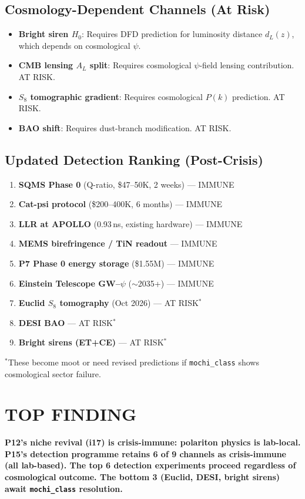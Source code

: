 \documentclass[11pt]{article}
\begin{document}
\subsection{Cosmology-Dependent Channels (At Risk)}
\begin{itemize}
\item \textbf{Bright siren $H_0$}: Requires DFD prediction for
  luminosity distance $d_L(z)$, which depends on cosmological $\psi$.
\item \textbf{CMB lensing $A_L$ split}: Requires cosmological
  $\psi$-field lensing contribution. AT RISK.
\item \textbf{$S_8$ tomographic gradient}: Requires cosmological
  $P(k)$ prediction. AT RISK.
\item \textbf{BAO shift}: Requires dust-branch modification. AT RISK.
\end{itemize}

\subsection{Updated Detection Ranking (Post-Crisis)}

\begin{enumerate}
\item \textbf{SQMS Phase 0} (Q-ratio, \$47--50K, 2 weeks) --- IMMUNE
\item \textbf{Cat-psi protocol} (\$200--400K, 6 months) --- IMMUNE
\item \textbf{LLR at APOLLO} (0.93\,ns, existing hardware) --- IMMUNE
\item \textbf{MEMS birefringence / TiN readout} --- IMMUNE
\item \textbf{P7 Phase 0 energy storage} (\$1.55M) --- IMMUNE
\item \textbf{Einstein Telescope GW--$\psi$} ($\sim$2035+) --- IMMUNE
\item \textbf{Euclid $S_8$ tomography} (Oct 2026) --- AT RISK$^*$
\item \textbf{DESI BAO} --- AT RISK$^*$
\item \textbf{Bright sirens (ET+CE)} --- AT RISK$^*$
\end{enumerate}

$^*$These become moot or need revised predictions if \texttt{mochi\_class}
shows cosmological sector failure.

\section*{TOP FINDING}

\begin{tcolorbox}[colback=blue!5!white, colframe=blue!70!black]
\textbf{P12's niche revival (i17) is crisis-immune: polariton physics
is lab-local. P15's detection programme retains 6 of 9 channels as
crisis-immune (all lab-based). The top 6 detection experiments proceed
regardless of cosmological outcome. The bottom 3 (Euclid, DESI, bright
sirens) await \texttt{mochi\_class} resolution.}
\end{tcolorbox}
\end{document}
